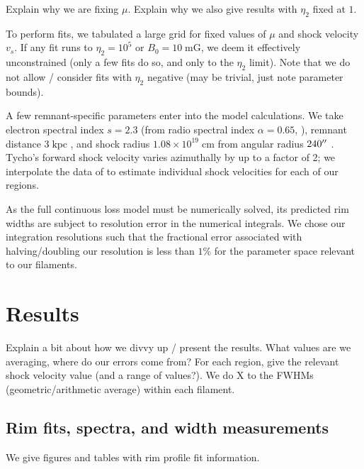 \documentclass[iop, apj, numberedappendix, twocolappendix]{emulateapj}
\newcommand{\mt}{\mathrm}
\newcommand{\unit}[1]{\;\mt{#1}}  %
\begin{document}
Explain why we are fixing $\mu$.
Explain why we also give results with $\eta_2$ fixed at $1$.

To perform fits, we tabulated a large grid for fixed values of $\mu$ and shock
velocity $v_s$.  If any fit runs to $\eta_2 = 10^5$ or $B_0 = 10 \unit{mG}$,
we deem it effectively unconstrained (only a few fits do so, and only to the
$\eta_2$ limit).
Note that we do not allow / consider fits with $\eta_2$ negative (may be
trivial, just note parameter bounds).

A few remnant-specific parameters enter into the model calculations.  We take
electron spectral index $s = 2.3$ (from radio spectral index $\alpha = 0.65$,
\citet{kothes2006} ),
remnant distance $3 \unit{kpc}$ \citep[cf.][]{hayato2010}, and
shock radius $1.08 \times 10^{19} \unit{cm}$ from angular radius $240\mbox{$^{\prime\prime}$}$
\citep{green2009}.  Tycho's forward shock velocity varies azimuthally by up to
a factor of 2; we interpolate the data of \citet{williams2013} to estimate
individual shock velocities for each of our regions.

As the full continuous loss model must be numerically solved, its predicted
rim widths are subject to resolution error in the numerical integrals.  We
chose our integration resolutions such that the fractional error associated
with halving/doubling our resolution is less than $1\%$ for the
parameter space relevant to our filaments. 

\section{Results}

Explain a bit about how we divvy up / present the results.  What values are we
averaging, where do our errors come from?
For each region, give the relevant shock velocity value (and a range of
values?).
We do X to the FWHMs (geometric/arithmetic average) within each filament.

\subsection{Rim fits, spectra, and width measurements}

We give figures and tables with rim profile fit information.
\end{document}
